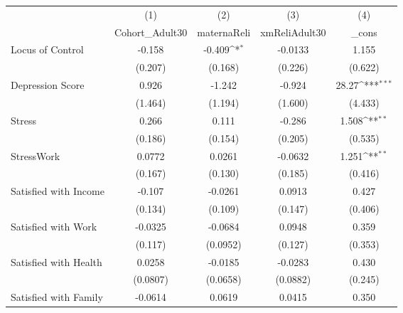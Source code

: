 {
\def\sym#1{\ifmmode^{#1}\else\(^{#1}\)\fi}
\begin{tabular}{l*{4}{c}}
\hline\hline
            &\multicolumn{1}{c}{(1)}&\multicolumn{1}{c}{(2)}&\multicolumn{1}{c}{(3)}&\multicolumn{1}{c}{(4)}\\
            &\multicolumn{1}{c}{Cohort\_Adult30}&\multicolumn{1}{c}{maternaReli}&\multicolumn{1}{c}{xmReliAdult30}&\multicolumn{1}{c}{\_cons}\\
\hline
Locus of Control&      -0.158         &      -0.409\sym{*}  &     -0.0133         &       1.155         \\
            &     (0.207)         &     (0.168)         &     (0.226)         &     (0.622)         \\
[1em]
Depression Score&       0.926         &      -1.242         &      -0.924         &       28.27\sym{***}\\
            &     (1.464)         &     (1.194)         &     (1.600)         &     (4.433)         \\
[1em]
Stress      &       0.266         &       0.111         &      -0.286         &       1.508\sym{**} \\
            &     (0.186)         &     (0.154)         &     (0.205)         &     (0.535)         \\
[1em]
StressWork  &      0.0772         &      0.0261         &     -0.0632         &       1.251\sym{**} \\
            &     (0.167)         &     (0.130)         &     (0.185)         &     (0.416)         \\
[1em]
Satisfied with Income&      -0.107         &     -0.0261         &      0.0913         &       0.427         \\
            &     (0.134)         &     (0.109)         &     (0.147)         &     (0.406)         \\
[1em]
Satisfied with Work&     -0.0325         &     -0.0684         &      0.0948         &       0.359         \\
            &     (0.117)         &    (0.0952)         &     (0.127)         &     (0.353)         \\
[1em]
Satisfied with Health&      0.0258         &     -0.0185         &     -0.0283         &       0.430         \\
            &    (0.0807)         &    (0.0658)         &    (0.0882)         &     (0.245)         \\
[1em]
Satisfied with Family&     -0.0614         &      0.0619         &      0.0415         &       0.350         \\

\end{tabular}}
